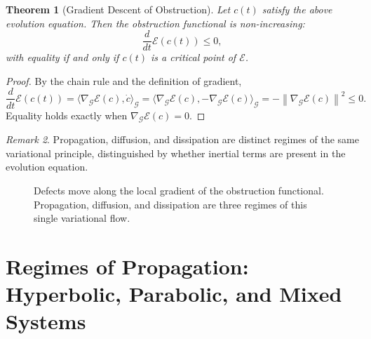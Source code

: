 \documentclass[12pt,a4paper,openany]{book}
\theoremstyle{plain}
\newtheorem{theorem}{Theorem}[chapter]
\theoremstyle{definition}
\theoremstyle{remark}
\newtheorem{remark}[theorem]{Remark}
\newcommand{\norm}[1]{\left\|#1\right\|}
\begin{document}
\begin{theorem}[Gradient Descent of Obstruction]
Let $c(t)$ satisfy the above evolution equation. Then the obstruction functional is non-increasing:
\[
\frac{d}{dt}\mathcal{E}(c(t)) \le 0,
\]
with equality if and only if $c(t)$ is a critical point of $\mathcal{E}$.
\end{theorem}

\begin{proof}
By the chain rule and the definition of gradient,
\[
\frac{d}{dt}\mathcal{E}(c(t))
=
\bigl\langle \nabla_{\mathcal{G}}\mathcal{E}(c), \dot{c} \bigr\rangle_{\mathcal{G}}
=
\bigl\langle \nabla_{\mathcal{G}}\mathcal{E}(c), -\nabla_{\mathcal{G}}\mathcal{E}(c) \bigr\rangle_{\mathcal{G}}
=
-\norm{\nabla_{\mathcal{G}}\mathcal{E}(c)}^{2} \le 0.
\]
Equality holds exactly when $\nabla_{\mathcal{G}}\mathcal{E}(c) = 0$.
\end{proof}

\begin{remark}
Propagation, diffusion, and dissipation are distinct regimes of the same variational principle, distinguished by whether inertial terms are present in the evolution equation.
\end{remark}

\begin{figure}[h]
\centering
{}
\caption[Variational descent]{Defects move along the local gradient of the obstruction functional. Propagation, diffusion, and dissipation are three regimes of this single variational flow.}
\label{fig:glyph_variational}
\end{figure}

\section{Regimes of Propagation: Hyperbolic, Parabolic, and Mixed Systems}
\label{sec:propagation_regimes}
\end{document}
